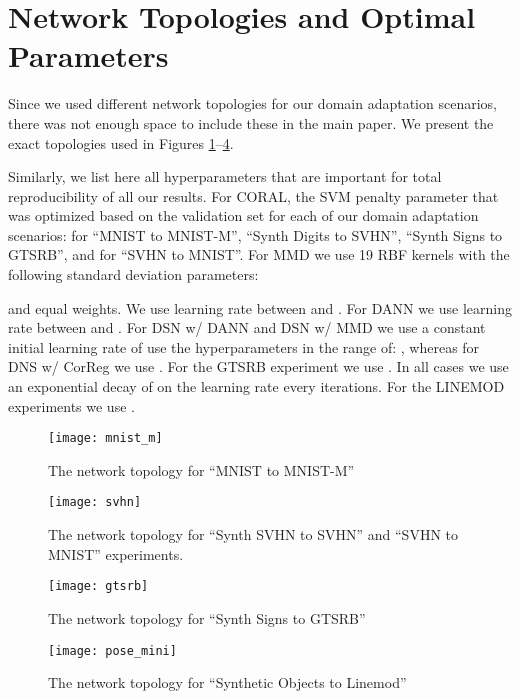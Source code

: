 \documentclass{article}
\begin{document}
\section{Network Topologies and Optimal Parameters}
Since we used different network topologies for our domain adaptation scenarios, there was not enough space to include these in the main paper. We present the exact topologies used in Figures \ref{fig:mnist_arch}--\ref{fig:mnist_arch4}. 

Similarly, we list here all hyperparameters that are important for total reproducibility of all our results.
For CORAL, the SVM
penalty parameter that was optimized based on the validation set for each of our domain adaptation scenarios:  for ``MNIST to MNIST-M'', ``Synth Digits to SVHN'', ``Synth Signs to GTSRB'', and   for ``SVHN to MNIST''.
For MMD we use 19 RBF kernels with the following standard deviation parameters:

and equal  weights. We use learning rate between  and . 
For DANN we use learning rate between  and .
For DSN w/ DANN and DSN w/ MMD we use a constant initial learning rate of   use the hyperparameters in the range of: , whereas for DNS w/ CorReg we use . For the GTSRB experiment we use . In all cases we use an exponential decay of  on the learning rate every  iterations. For the LINEMOD experiments we use .




\begin{figure}
    \centering
    \texttt{[image: mnist\_m]}
    \caption{The network topology for ``MNIST to MNIST-M''}
    \label{fig:mnist_arch}
\end{figure}

\begin{figure}
    \centering
    \texttt{[image: svhn]}
    \caption{The network topology for ``Synth SVHN to SVHN'' and ``SVHN to MNIST'' experiments.}
    \label{fig:mnist_arch2}
\end{figure}

\begin{figure}
    \centering
    \texttt{[image: gtsrb]}
    \caption{The network topology for ``Synth Signs to GTSRB''}
    \label{fig:mnist_arch3}
\end{figure}


\begin{figure}
    \centering
    \texttt{[image: pose\_mini]}
    \caption{The network topology for ``Synthetic Objects to Linemod''}
    \label{fig:mnist_arch4}
\end{figure}

\clearpage



 
\end{document}
